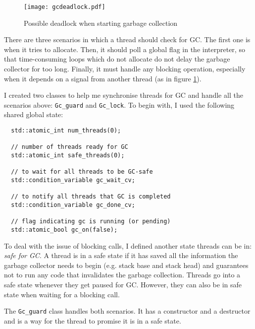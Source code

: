 \begin{figure}[H]
  \centering
  \texttt{[image: gcdeadlock.pdf]}
  \caption{Possible deadlock when starting garbage collection}
  \label{fig:gcdeadlock}
\end{figure}

There are three scenarios in which a thread should check for GC. The first one is when it tries to allocate.
Then, it should poll a global flag in the interpreter, so that time-consuming loops which do not allocate do not
delay the garbage collector for too long. Finally, it must handle any blocking operation, especially
when it depends on a signal from another thread (as in figure \ref{fig:gcdeadlock}).

I created two classes to help me synchronise threads for GC and handle all the scenarios above:
\verb|Gc_guard| and \verb|Gc_lock|.
To begin with, I used the following shared global state:
\begin{code}
\begin{verbatim}
  std::atomic_int num_threads(0);

  // number of threads ready for GC
  std::atomic_int safe_threads(0);

  // to wait for all threads to be GC-safe
  std::condition_variable gc_wait_cv;

  // to notify all threads that GC is completed
  std::condition_variable gc_done_cv;

  // flag indicating gc is running (or pending)
  std::atomic_bool gc_on(false);
\end{verbatim}
\end{code}

To deal with the issue of blocking calls, I defined another state threads can be in: \emph{safe for GC}. A thread
is in a safe state if it has saved all the information the garbage collector needs to begin (e.g. stack base
and stack head) and guarantees not to run any code that invalidates the garbage collection. Threads go into a safe
state whenever they get paused for GC. However, they can also be in safe state when waiting for a blocking call.

The \verb|Gc_guard| class handles both scenarios.
It has a constructor and a destructor and is a way for the thread to promise it is in a safe state.

